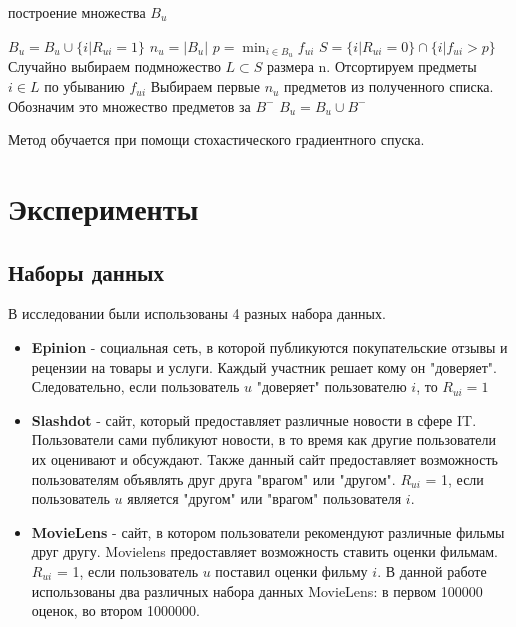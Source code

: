 \documentclass[a4paper,12pt]{article}
\begin{document}
\begin{algorithm}[h]
\caption{построение множества $B_{u}$}
\begin{algorithmic}[1]
\State $B_u = B_u \cup \{i | R_{ui} = 1 \}$
\State $n_u = |B_u|$
\State $p = \min_{i \in B_u} f_{ui}$
\State $S  = \{i |R_{ui} = 0 \} \cap \{i| f_{ui} > p \}$
\State Случайно выбираем подмножество $L \subset S$ размера n.
\State Отсортируем предметы $i \in L$ по убыванию $f_{ui}$
\State Выбираем первые $n_u$ предметов из полученного списка. Обозначим это множество предметов за $B^{-}$
\State $B_u = B_u \cup B^{-}$  
\end{algorithmic}
\label{alg:setB}
\end{algorithm}

Метод обучается при помощи стохастического градиентного спуска.


\section{Эксперименты}

\subsection{Наборы данных}
В исследовании были использованы 4 разных набора данных.

\begin{itemize}
\item \textbf{Epinion} - социальная сеть, в которой публикуются покупательские отзывы и рецензии на товары и услуги. Каждый участник  решает кому он "доверяет". Следовательно, если пользователь $u$ "доверяет" пользователю $i$, то $R_{ui} = 1$

\item \textbf{Slashdot} - сайт, который предоставляет различные новости в сфере IT. Пользователи сами публикуют новости, в то время как другие пользователи их оценивают и обсуждают. Также данный сайт предоставляет возможность пользователям объявлять друг друга "врагом" или "другом".  $R_{ui}$ = 1, если пользователь $u$ является "другом" или "врагом" пользователя $i$.

\item \textbf{MovieLens} - сайт, в котором пользователи рекомендуют различные фильмы друг другу. Movielens предоставляет возможность ставить оценки фильмам. $R_{ui}$ = 1, если пользователь $u$ поставил оценки фильму $i$. В данной работе использованы два различных набора данных MovieLens: в первом 100000 оценок, во втором 1000000.

\end{itemize}
\end{document}
